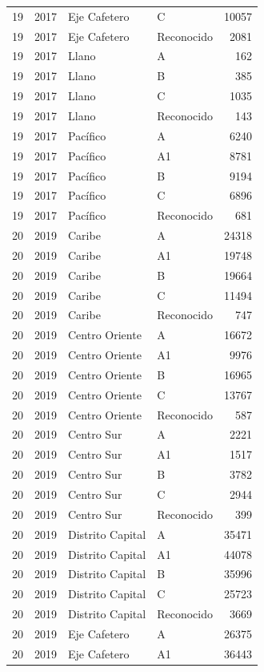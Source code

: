 \begin{longtable}{rrllr}
19 & 2017 & Eje Cafetero & C & 10057 \\
19 & 2017 & Eje Cafetero & Reconocido & 2081 \\
19 & 2017 & Llano & A & 162 \\
19 & 2017 & Llano & B & 385 \\
19 & 2017 & Llano & C & 1035 \\
19 & 2017 & Llano & Reconocido & 143 \\
19 & 2017 & Pacífico & A & 6240 \\
19 & 2017 & Pacífico & A1 & 8781 \\
19 & 2017 & Pacífico & B & 9194 \\
19 & 2017 & Pacífico & C & 6896 \\
19 & 2017 & Pacífico & Reconocido & 681 \\
20 & 2019 & Caribe & A & 24318 \\
20 & 2019 & Caribe & A1 & 19748 \\
20 & 2019 & Caribe & B & 19664 \\
20 & 2019 & Caribe & C & 11494 \\
20 & 2019 & Caribe & Reconocido & 747 \\
20 & 2019 & Centro Oriente & A & 16672 \\
20 & 2019 & Centro Oriente & A1 & 9976 \\
20 & 2019 & Centro Oriente & B & 16965 \\
20 & 2019 & Centro Oriente & C & 13767 \\
20 & 2019 & Centro Oriente & Reconocido & 587 \\
20 & 2019 & Centro Sur & A & 2221 \\
20 & 2019 & Centro Sur & A1 & 1517 \\
20 & 2019 & Centro Sur & B & 3782 \\
20 & 2019 & Centro Sur & C & 2944 \\
20 & 2019 & Centro Sur & Reconocido & 399 \\
20 & 2019 & Distrito Capital & A & 35471 \\
20 & 2019 & Distrito Capital & A1 & 44078 \\
20 & 2019 & Distrito Capital & B & 35996 \\
20 & 2019 & Distrito Capital & C & 25723 \\
20 & 2019 & Distrito Capital & Reconocido & 3669 \\
20 & 2019 & Eje Cafetero & A & 26375 \\
20 & 2019 & Eje Cafetero & A1 & 36443 \\

\end{longtable}
